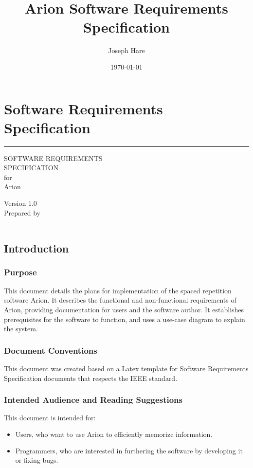 \documentclass{scrreprt}
\title{Arion Software Requirements Specification}
\author{Joseph Hare}
\date{\today}
\makeatletter
\newcommand{\theauthor}{\@author}
\newcommand{\thedate}{\@date}
\newcommand{\version}{1.0 }
\newcommand{\bigspace}{\vspace{1.9cm}}
\newcommand{\smallspace}{\vspace{0.5cm}}
\makeatother
\begin{document}
\part{Software Requirements Specification}

\begin{flushright}
    \rule{\linewidth}{5pt}
    \vskip 1cm
    \begin{bfseries}
        \Huge
        SOFTWARE REQUIREMENTS\\
        SPECIFICATION\\
        \smallspace
        for\\
        \smallspace
        Arion\\
        \bigspace

        \LARGE
        Version \version \\
        \smallspace
        Prepared by \theauthor\\
        \smallspace
        \thedate\\
    \end{bfseries}
\end{flushright}

\tableofcontents


\chapter{Introduction}

\section{Purpose}
This document details the plans for implementation of the spaced repetition software Arion.
It describes the functional and non-functional requirements of Arion, providing documentation for users
and the software author.
It establishes prerequisites for the software to function, and uses a use-case diagram to explain the system.

\section{Document Conventions}
This document was created based on a Latex template for Software Requirements Specification documents that
respects the IEEE standard.

\section{Intended Audience and Reading Suggestions}
This document is intended for:
\begin{itemize}
    \item Users, who want to use Arion to efficiently memorize information.
    \item Programmers, who are interested in furthering the software by developing it or
fixing bugs. 
\end{itemize}
\end{document}
